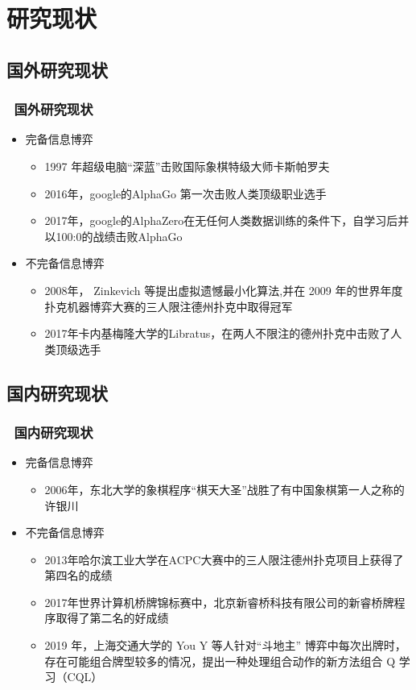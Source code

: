 \documentclass[11pt, CJK]{beamer}
\begin{document}
	\section{研究现状}
		\subsection*{国外研究现状}
		\begin{frame}
			\frametitle{~国外研究现状}
			\begin{itemize}
				\item 完备信息博弈
				\begin{itemize}
					\setlength{\baselineskip}{16pt}
					\item 1997 年超级电脑“深蓝”击败国际象棋特级大师卡斯帕罗夫
					\item 2016年，google的AlphaGo 第一次击败人类顶级职业选手
					\item 2017年，google的AlphaZero在无任何人类数据训练的条件下，自学习后并以100:0的战绩击败AlphaGo
				\end{itemize}
				\vskip 8pt 
				\item 不完备信息博弈
				\begin{itemize}
					\setlength{\baselineskip}{16pt}
					\item 2008年， Zinkevich 等提出虚拟遗憾最小化算法,并在 2009 年的世界年度扑克机器博弈大赛的三人限注德州扑克中取得冠军
					\item 2017年卡内基梅隆大学的Libratus，在两人不限注的德州扑克中击败了人类顶级选手
				\end{itemize}
			\end{itemize}
		\end{frame}
		\subsection*{国内研究现状}
		\begin{frame}
			\frametitle{~国内研究现状}
			\begin{itemize}
				\item 完备信息博弈
				\begin{itemize}
					\setlength{\baselineskip}{16pt}
					\item 2006年，东北大学的象棋程序“棋天大圣”战胜了有中国象棋第一人之称的许银川
				\end{itemize}
				\item 不完备信息博弈
				\begin{itemize}
					\setlength{\baselineskip}{16pt}
					\item 2013年哈尔滨工业大学在ACPC大赛中的三人限注德州扑克项目上获得了第四名的成绩
					\item 2017年世界计算机桥牌锦标赛中，北京新睿桥科技有限公司的新睿桥牌程序取得了第二名的好成绩
					\item 2019 年，上海交通大学的 You Y 等人针对“斗地主” 博弈中每次出牌时，存在可能组合牌型较多的情况，提出一种处理组合动作的新方法组合 Q 学习（CQL） 
				\end{itemize}
			\end{itemize}
		\end{frame}
		
\end{document}
